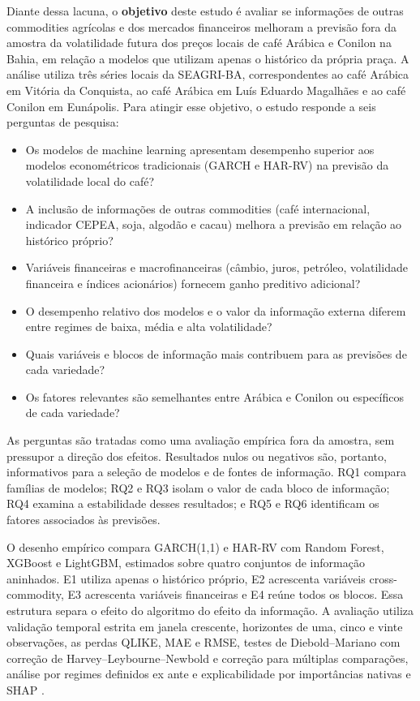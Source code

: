 \documentclass[a4paper,fleqn]{cas-sc}
\begin{document}
Diante dessa lacuna, o \textbf{objetivo} deste estudo é avaliar se informações de outras commodities agrícolas e dos mercados financeiros melhoram a previsão fora da amostra da volatilidade futura dos preços locais de café Arábica e Conilon na Bahia, em relação a modelos que utilizam apenas o histórico da própria praça. A análise utiliza três séries locais da SEAGRI-BA, correspondentes ao café Arábica em Vitória da Conquista, ao café Arábica em Luís Eduardo Magalhães e ao café Conilon em Eunápolis. Para atingir esse objetivo, o estudo responde a seis perguntas de pesquisa:

\begin{itemize}
\item[\textbf{RQ1.}] Os modelos de machine learning apresentam desempenho superior aos modelos econométricos tradicionais (GARCH e HAR-RV) na previsão da volatilidade local do café?
\item[\textbf{RQ2.}] A inclusão de informações de outras commodities (café internacional, indicador CEPEA, soja, algodão e cacau) melhora a previsão em relação ao histórico próprio?
\item[\textbf{RQ3.}] Variáveis financeiras e macrofinanceiras (câmbio, juros, petróleo, volatilidade financeira e índices acionários) fornecem ganho preditivo adicional?
\item[\textbf{RQ4.}] O desempenho relativo dos modelos e o valor da informação externa diferem entre regimes de baixa, média e alta volatilidade?
\item[\textbf{RQ5.}] Quais variáveis e blocos de informação mais contribuem para as previsões de cada variedade?
\item[\textbf{RQ6.}] Os fatores relevantes são semelhantes entre Arábica e Conilon ou específicos de cada variedade?
\end{itemize}

As perguntas são tratadas como uma avaliação empírica fora da amostra, sem pressupor a direção dos efeitos. Resultados nulos ou negativos são, portanto, informativos para a seleção de modelos e de fontes de informação. RQ1 compara famílias de modelos; RQ2 e RQ3 isolam o valor de cada bloco de informação; RQ4 examina a estabilidade desses resultados; e RQ5 e RQ6 identificam os fatores associados às previsões.

O desenho empírico compara GARCH(1,1) e HAR-RV com Random Forest, XGBoost e LightGBM, estimados sobre quatro conjuntos de informação aninhados. E1 utiliza apenas o histórico próprio, E2 acrescenta variáveis cross-commodity, E3 acrescenta variáveis financeiras e E4 reúne todos os blocos. Essa estrutura separa o efeito do algoritmo do efeito da informação. A avaliação utiliza validação temporal estrita em janela crescente, horizontes de uma, cinco e vinte observações, as perdas QLIKE, MAE e RMSE, testes de Diebold--Mariano com correção de Harvey--Leybourne--Newbold e correção para múltiplas comparações, análise por regimes definidos ex ante e explicabilidade por importâncias nativas e SHAP \citep{Wang2024SystemicRiskML,Diachkov2026FinancialStressML}.
\end{document}
